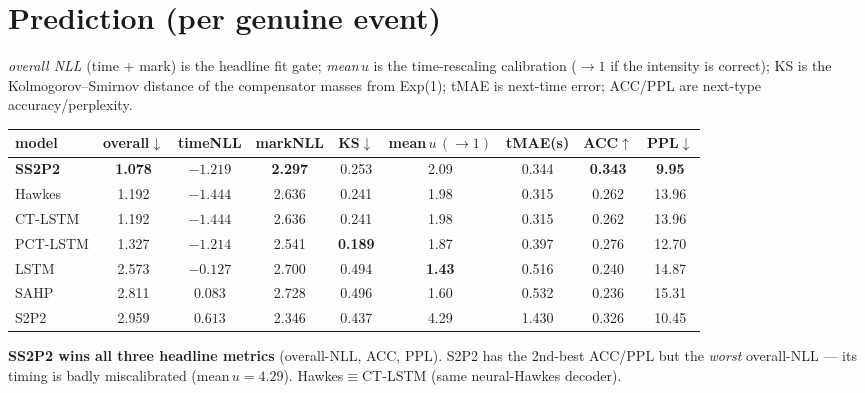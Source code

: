 \documentclass[11pt]{article}
\newcommand{\bbest}[1]{\textbf{#1}}
\begin{document}
\section{Prediction (per genuine event)}
\emph{overall NLL} (time + mark) is the headline fit gate; \emph{mean\,$u$} is the time-rescaling
calibration ($\to1$ if the intensity is correct); KS is the Kolmogorov--Smirnov distance of the
compensator masses from Exp(1); tMAE is next-time error; ACC/PPL are next-type accuracy/perplexity.
\begin{center}\small\renewcommand{\arraystretch}{1.25}
\begin{tabular}{lcccccccc}
\toprule
model & overall$\downarrow$ & timeNLL & markNLL & KS$\downarrow$ & mean\,$u\,(\to1)$ & tMAE(s) & ACC$\uparrow$ & PPL$\downarrow$\\
\midrule
\rowcolor{best}\textbf{SS2P2} & \bbest{1.078} & $-1.219$ & \bbest{2.297} & 0.253 & 2.09 & 0.344 & \bbest{0.343} & \bbest{9.95}\\
Hawkes   & 1.192 & $-1.444$ & 2.636 & 0.241 & 1.98 & 0.315 & 0.262 & 13.96\\
CT-LSTM  & 1.192 & $-1.444$ & 2.636 & 0.241 & 1.98 & 0.315 & 0.262 & 13.96\\
PCT-LSTM & 1.327 & $-1.214$ & 2.541 & \bbest{0.189} & 1.87 & 0.397 & 0.276 & 12.70\\
LSTM     & 2.573 & $-0.127$ & 2.700 & 0.494 & \bbest{1.43} & 0.516 & 0.240 & 14.87\\
SAHP     & 2.811 & $0.083$  & 2.728 & 0.496 & 1.60 & 0.532 & 0.236 & 15.31\\
S2P2     & 2.959 & $0.613$  & 2.346 & 0.437 & 4.29 & 1.430 & 0.326 & 10.45\\
\bottomrule
\end{tabular}
\end{center}
\noindent\textbf{SS2P2 wins all three headline metrics} (overall-NLL, ACC, PPL). S2P2 has the 2nd-best
ACC/PPL but the \emph{worst} overall-NLL — its timing is badly miscalibrated (mean\,$u=4.29$).
Hawkes$\equiv$CT-LSTM (same neural-Hawkes decoder).
\end{document}
